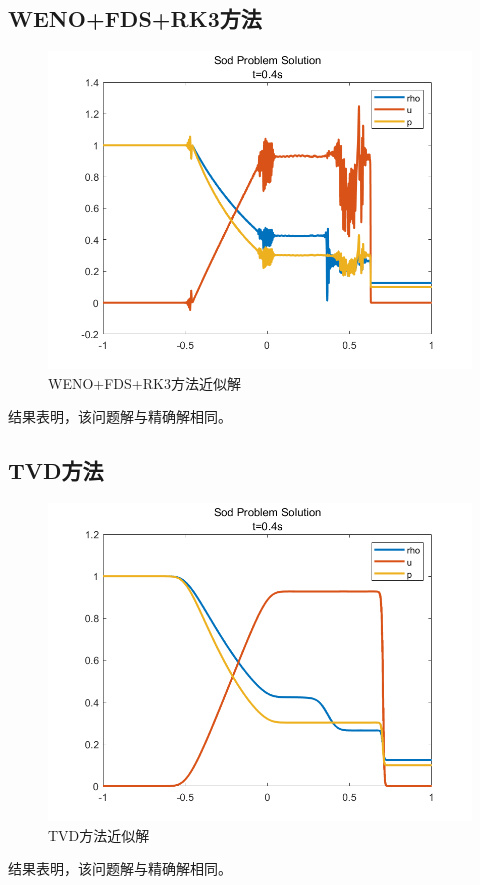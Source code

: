 \documentclass[12pt,a4paper]{article}%
\begin{document}
		\subsection{WENO+FDS+RK3方法}
		\begin{figure}[H]
			\centering
			\begin{minipage}{0.83\textwidth}
				\centering
				\includegraphics[width=\textwidth]{./fig/app2.png}
				\caption{\fontsize{10pt}{15pt}\selectfont WENO+FDS+RK3方法近似解}
			\end{minipage}
		\end{figure}
		结果表明，该问题解与精确解相同。	
		
		\subsection{TVD方法}
		\begin{figure}[H]
			\centering
			\begin{minipage}{0.83\textwidth}
				\centering
				\includegraphics[width=\textwidth]{./fig/app3.png}
				\caption{\fontsize{10pt}{15pt}\selectfont TVD方法近似解}
			\end{minipage}
		\end{figure}
		结果表明，该问题解与精确解相同。	
			
\end{document}
